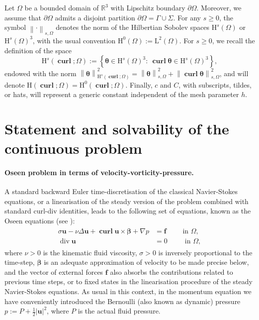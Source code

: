 \documentclass[reqno,a4paper]{article}
\numberwithin{equation}{section}
\newcommand\ff{\boldsymbol{f}}
\newcommand\bu{\boldsymbol{u}}
\newcommand\bbbeta{\boldsymbol{\beta}}
\newcommand\R{\mathbb{R}}
\newcommand{\norm}[1]{\left\|#1\right\|}
\newcommand{\set}[1]{\left\{#1\right\}}
\newcommand\DO{\partial\O}
\renewcommand\O{\Omega}
\renewcommand\H{\mathrm{H}}
\renewcommand\L{\mathrm{L}}
\newcommand\LO{\L^2(\O)}
\newcommand\vdiv{\mathop{\mathrm{div}}\nolimits}
\newcommand\HsO{\H^s(\O)}
\newcommand\btheta{\boldsymbol{\theta}}
\newcommand\curl{\mathop{\mathbf{curl}}\nolimits}
\begin{document}
Let $\O$ be a  bounded domain of $\R^3$ with Lipschitz boundary $\DO$.
Moreover, we assume that $\DO$ admits a
disjoint partition $\DO=\Gamma\cup \Sigma$. For any $s\geq 0$, the symbol 
$\norm{\cdot}_{s,\O}$ denotes 
the norm of the Hilbertian Sobolev spaces $\HsO$ or
$\HsO^3$, with the usual convention $\H^0(\O):=\LO$. For $s\geq 0$, we recall 
the definition of the space 
$$\H^s(\curl;\O):=\set{\btheta\in\HsO^3:\ \curl\btheta\in\HsO^3},$$ endowed with the norm
 $\norm{\btheta}^2_{\H^s(\curl;\O)}=\norm{\btheta}_{s,\O}^2+\norm{\curl\btheta}^2_{s,\O}$, and will denote 
$\H(\curl;\O)=\H^0(\curl;\O)$. Finally, $c$ and
$C$, with subscripts, tildes, or hats, will represent a generic constant
independent of the mesh parameter $h$.




\section{Statement and solvability of the continuous problem}\label{sec:model}
\paragraph{Oseen problem in terms of velocity-vorticity-pressure.}
A standard backward Euler time-discretisation of the classical Navier-Stokes 
equations, or a linearisation of the 
steady version of the problem combined with standard curl-div identities, 
 leads to the following set of equations, known as the 
Oseen equations (see \cite{oseen,gr-1986}): 
%
\begin{align}\label{NS-cont-vort}\begin{split}
\sigma\bu-\nu\Delta\bu+\curl\bu\times\bbbeta +\nabla p & = 
  \ff \qquad \mbox{ in } \O, \\
  \vdiv\bu & =  0 \qquad\, \mbox{ in } \O,  
 \end{split}\end{align}
where $\nu>0$ is the kinematic fluid viscosity, 
 $\sigma>0$ is inversely proportional to the time-step, $\bbbeta$ is 
 an adequate approximation of velocity to be made precise below, and 
the vector of external forces $\ff$ also absorbs the contributions related to previous time steps, or to fixed states in 
the linearisation procedure of the steady Navier-Stokes equations. As usual in this context, in the momentum 
equation we have conveniently introduced the Bernoulli (also known as 
dynamic) pressure $p := P + \frac{1}{2}\vert\bu\vert^2$, where $P$ is the actual fluid pressure. 
\end{document}
